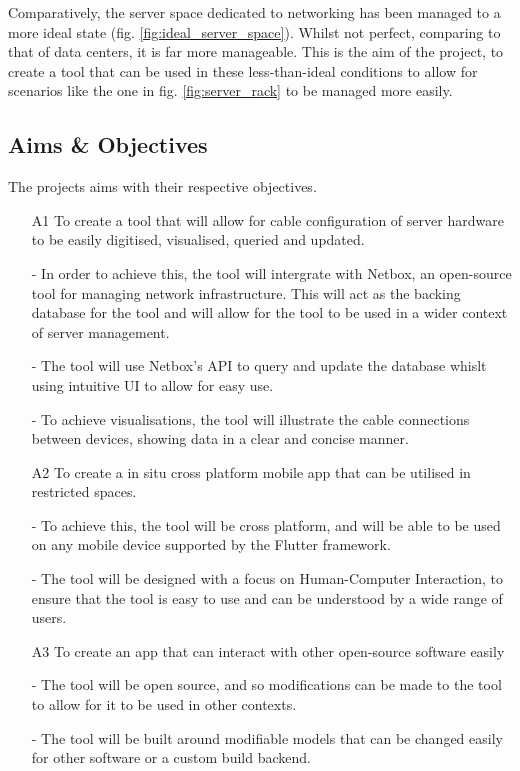 \documentclass [12pt,letterpaper]{article}
\begin{document}
\pagebreak
Comparatively, the server space dedicated to networking has been managed to a more ideal state (fig. \ref{fig:ideal_server_space}). Whilst not perfect, comparing to that of data centers, it is far more manageable. This is the aim of the project, to create a tool that can be used in these less-than-ideal conditions to allow for scenarios like the one in fig. \ref{fig:server_rack} to be managed more easily.

\subsection{Aims \& Objectives}
\label{sec:objectives}
The projects aims with their respective objectives.
\begin{enumerate}
    

    \item[A1] To create a tool that will allow for cable configuration of server hardware to be
    easily digitised, visualised, queried and updated.
        
        - In order to achieve this, the tool will intergrate with Netbox, an open-source tool for managing network infrastructure. This will act as the backing database for the tool and will allow for the tool to be used in a wider context of server management.
        
        - The tool will use Netbox's API to query and update the database whislt using intuitive UI to allow for easy use.
        
        - To achieve visualisations, the tool will illustrate the cable connections between devices, showing data in a clear and concise manner.

    \item[A2] To create a in situ cross platform mobile app that can be utilised in restricted
    spaces.    

        - To achieve this, the tool will be cross platform, and will be able to be used on any mobile device supported by the Flutter framework.
        
        - The tool will be designed with a focus on Human-Computer Interaction, to ensure that the tool is easy to use and can be understood by a wide range of users.

    \item[A3] To create an app that can interact with other open-source software easily
    
        - The tool will be open source, and so modifications can be made to the tool to allow for it to be used in other contexts.
        
        - The tool will be built around modifiable models that can be changed easily for other software or a custom build backend.

\end{enumerate}
\pagebreak
\end{document}
